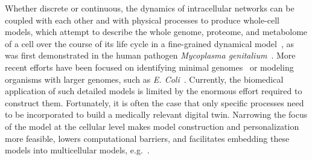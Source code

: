 \documentclass[12pt]{article}
\renewcommand{\(}{\left(}
\renewcommand{\)}{\right)}
\renewcommand{\[}{\left[}
\renewcommand{\]}{\right]}
\newcommand{\rev}[1]{{\color{red} #1}}
\begin{document}
Whether discrete or continuous, the dynamics of intracellular networks can be coupled with each other and with physical processes to produce whole-cell models, which attempt to describe the whole genome, proteome, and metabolome of a cell over the course of its life cycle in a fine-grained dynamical model~\cite{bhat2020WholeCellModelingSimulation}, as was first demonstrated in the human pathogen \emph{Mycoplasma genitalium}~\cite{karr2012WholeCellComputationalModel}. More recent efforts have been focused on identifying minimal genomes~\cite{rees-garbutt2020DesigningMinimalGenomes} or modeling organisms with larger genomes, such as \emph{E. Coli}~\cite{sun2021ColiWholeCellModeling}. Currently, the biomedical application of such detailed models is limited by the enormous effort required to construct them. Fortunately, it is often the case that only specific processes need to be incorporated to build a medically relevant digital twin. Narrowing the focus of the model at the cellular level makes model construction and personalization more feasible, lowers computational barriers, and facilitates embedding these models into multicellular models, e.g.~\cite{poncedeleon2023PhysiBoSSSustainableIntegration}.



\end{document}

